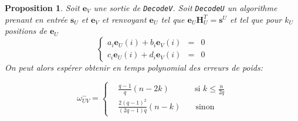 \documentclass[12pt]{article}
\theoremstyle{plain}
\newtheorem{propo}[thm]{Proposition}
\theoremstyle{definition}
\begin{document}
\begin{propo}\label{Wuv-} Soit $\mathbf{e}_V$ une sortie de \verb|DecodeV|. Soit \verb|DecodeU| un algorithme prenant en entrée $\mathbf{s}_U$ et $\mathbf{e}_V$ et renvoyant $\mathbf{e}_U$ tel que $\mathbf{e}_U\mathbf{H}_U^T = \mathbf{s}^U$ et tel que pour $k_U$ positions de $\mathbf{e}_U$ 
\begin{equation}\label{syst petit poid}
\left \{
\begin{array}{rcl}
a_i\mathbf{e}_U(i) + b_i\mathbf{e}_V(i) &=& 0 \\
c_i\mathbf{e}_U(i) + d_i\mathbf{e}_V(i) &=& 0
\end{array}
\right.
\end{equation}
On peut alors espérer obtenir en temps polynomial des erreurs de poids:
\begin{center}
\begin{equation} 
\omega^-_{UV} = 
\left \{
\begin{array}{rcl}
&\frac{q-1}{q}(n-2k) & \;\; \text{ si } k \leq \frac{n}{2q} \\
&\frac{2(q-1)^2}{(2q-1)q}(n-k) & \quad \text{sinon}
\end{array}
\right.
\end{equation}
\end{center}
\end{propo}
\end{document}
